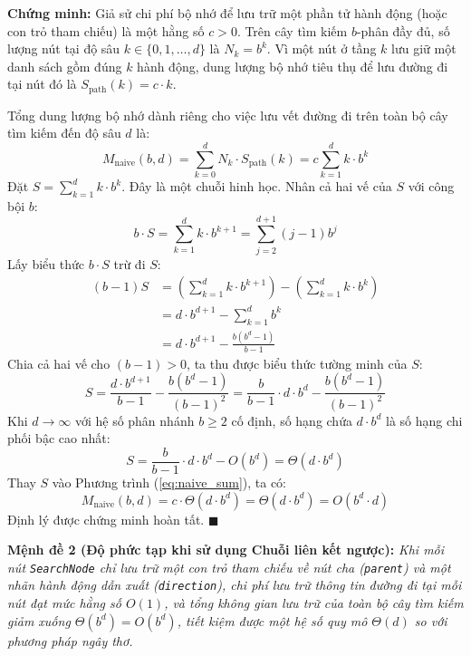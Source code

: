 \noindent
\textbf{Chứng minh:}
Giả sử chi phí bộ nhớ để lưu trữ một phần tử hành động (hoặc con trỏ tham chiếu) là một hằng số $c > 0$.
Trên cây tìm kiếm $b$-phân đầy đủ, số lượng nút tại độ sâu $k \in \{0, 1, \dots, d\}$ là $N_k = b^k$.
Vì một nút ở tầng $k$ lưu giữ một danh sách gồm đúng $k$ hành động, dung lượng bộ nhớ tiêu thụ
để lưu đường đi tại nút đó là $S_{\text{path}}(k) = c \cdot k$.

Tổng dung lượng bộ nhớ dành riêng cho việc lưu vết đường đi trên toàn bộ cây tìm kiếm đến độ sâu $d$ là:
\begin{equation}
    M_{\text{naive}}(b, d) = \sum_{k=0}^{d} N_k \cdot S_{\text{path}}(k)
    = c \sum_{k=1}^{d} k \cdot b^k
    \label{eq:naive_sum}
\end{equation}
Đặt $S = \sum_{k=1}^{d} k \cdot b^k$. Đây là một chuỗi hinh học.
Nhân cả hai vế của $S$ với công bội $b$:
\begin{equation}
    b \cdot S = \sum_{k=1}^{d} k \cdot b^{k+1} = \sum_{j=2}^{d+1} (j - 1) b^j
\end{equation}
Lấy biểu thức $b \cdot S$ trừ đi $S$:
\begin{align}
    (b - 1) S &= \left( \sum_{k=1}^{d} k \cdot b^{k+1} \right) - \left( \sum_{k=1}^{d} k \cdot b^k \right) \nonumber \\
              &= d \cdot b^{d+1} - \sum_{k=1}^{d} b^k \nonumber \\
              &= d \cdot b^{d+1} - \frac{b(b^d - 1)}{b - 1}
\end{align}
Chia cả hai vế cho $(b - 1) > 0$, ta thu được biểu thức tường minh của $S$:
\begin{equation}
    S = \frac{d \cdot b^{d+1}}{b - 1} - \frac{b(b^d - 1)}{(b - 1)^2}
      = \frac{b}{b - 1} \cdot d \cdot b^d - \frac{b(b^d - 1)}{(b - 1)^2}
\end{equation}
Khi $d \to \infty$ với hệ số phân nhánh $b \ge 2$ cố định, số hạng chứa $d \cdot b^d$ là số hạng
chi phối bậc cao nhất:
\begin{equation}
    S = \frac{b}{b - 1} \cdot d \cdot b^d - O(b^d) = \Theta(d \cdot b^d)
\end{equation}
Thay $S$ vào Phương trình (\ref{eq:naive_sum}), ta có:
\begin{equation}
    M_{\text{naive}}(b, d) = c \cdot \Theta(d \cdot b^d) = \Theta(d \cdot b^d) = O(b^d \cdot d)
\end{equation}
Định lý được chứng minh hoàn tất. \hfill $\blacksquare$

\vspace{0.3cm}
\noindent
\textbf{Mệnh đề 2 (Độ phức tạp khi sử dụng Chuỗi liên kết ngược):}
\textit{Khi mỗi nút \texttt{SearchNode} chỉ lưu trữ một con trỏ tham chiếu về nút cha (\texttt{parent})
và một nhãn hành động dẫn xuất (\texttt{direction}), chi phí lưu trữ thông tin đường đi tại mỗi nút
đạt mức hằng số $O(1)$, và tổng không gian lưu trữ của toàn bộ cây tìm kiếm giảm xuống $\Theta(b^d) = O(b^d)$,
tiết kiệm được một hệ số quy mô $\Theta(d)$ so với phương pháp ngây thơ.}

